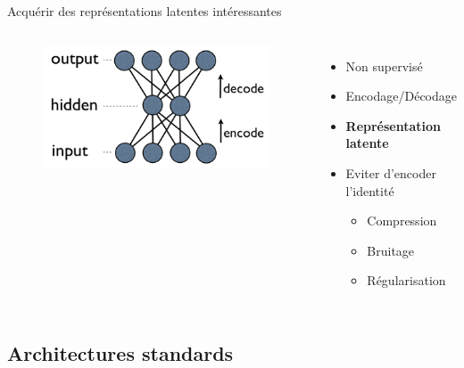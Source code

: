 \documentclass{beamer}
\begin{document}
\begin{frame}{Acquérir des représentations latentes intéressantes}

  \begin{columns}
    \begin{figure}
      \centering
      \includegraphics[scale=0.8]{../Figures/DenseAuto}
    \end{figure}

    \begin{itemize}
    \item Non supervisé
    \item Encodage/Décodage
    \item \textbf{Représentation latente}
    \item Eviter d'encoder l'identité\pause
      \begin{itemize}
      \item Compression\pause
      \item Bruitage\pause
      \item Régularisation
      \end{itemize}
    \end{itemize}
  \end{columns}
\end{frame}

\subsection{Architectures standards}
\end{document}
